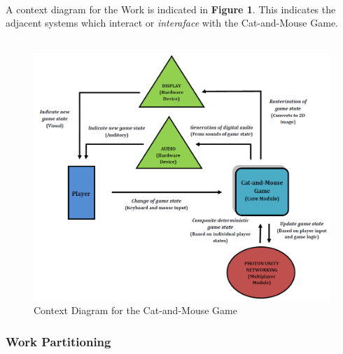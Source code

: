 \documentclass[12pt, titlepage]{article}
\begin{document}
\paragraph{}A context diagram for the Work is indicated in \textbf{Figure 1}. This indicates the adjacent systems which interact or \emph{interaface} with the Cat-and-Mouse Game.
\\
\\
\begin {figure}[h]
    \centering
\includegraphics[width=\textwidth]{ContextDiagram.png}
\caption{Context Diagram for the Cat-and-Mouse Game}
\end{figure}
\newpage
\subsubsection{Work Partitioning}
\end{document}
